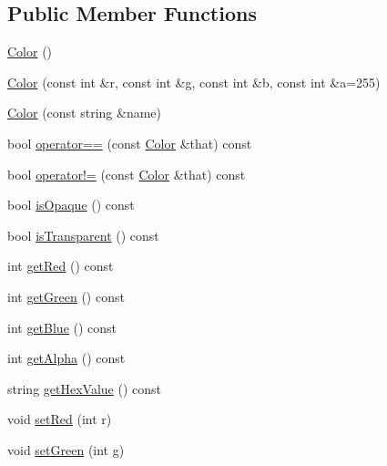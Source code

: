 \subsection*{Public Member Functions}
\begin{DoxyCompactItemize}
\item 
\hyperlink{classbridges_1_1datastructure_1_1_color_ad6b8b6b89a54ebea80d211679e10be3e}{Color} ()
\item 
\hyperlink{classbridges_1_1datastructure_1_1_color_a0b746741c261fdc010adab62bbdb862c}{Color} (const int \&r, const int \&g, const int \&b, const int \&a=255)
\item 
\hyperlink{classbridges_1_1datastructure_1_1_color_a9db6443e24d6f946c085b2d8677d9c52}{Color} (const string \&name)
\item 
bool \hyperlink{classbridges_1_1datastructure_1_1_color_a43a31ca1f860081116197c9b29e4aa45}{operator==} (const \hyperlink{classbridges_1_1datastructure_1_1_color}{Color} \&that) const
\item 
bool \hyperlink{classbridges_1_1datastructure_1_1_color_aa3eb6797dc6d27681415569cf67d9196}{operator!=} (const \hyperlink{classbridges_1_1datastructure_1_1_color}{Color} \&that) const
\item 
bool \hyperlink{classbridges_1_1datastructure_1_1_color_acd9400b1b5f621e9147204e2bee5e29a}{is\+Opaque} () const
\item 
bool \hyperlink{classbridges_1_1datastructure_1_1_color_a82713b25585724ddcb73d3c209aaaad9}{is\+Transparent} () const
\item 
int \hyperlink{classbridges_1_1datastructure_1_1_color_a7460203f01e0437e7ce23d85bffdb7ed}{get\+Red} () const
\item 
int \hyperlink{classbridges_1_1datastructure_1_1_color_a4e97402d8321374a6d97327dad603341}{get\+Green} () const
\item 
int \hyperlink{classbridges_1_1datastructure_1_1_color_a07ea27d8745ddec7834fe9ec7fca4032}{get\+Blue} () const
\item 
int \hyperlink{classbridges_1_1datastructure_1_1_color_a07964b6c9fce8c3b4a3ba28169bf2103}{get\+Alpha} () const
\item 
string \hyperlink{classbridges_1_1datastructure_1_1_color_a494648d2940754828f2054f92de031dc}{get\+Hex\+Value} () const
\item 
void \hyperlink{classbridges_1_1datastructure_1_1_color_a487be07319fe83e9642cd0387ebed33a}{set\+Red} (int r)
\item 
void \hyperlink{classbridges_1_1datastructure_1_1_color_ac1ac36232f13188eac0d7270a946261a}{set\+Green} (int g)

\end{DoxyCompactItemize}
